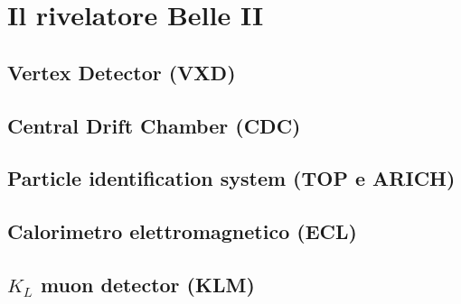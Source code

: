\newpage





\section{Il rivelatore Belle II}

\begin{comment}
Il rivelatore Belle II è uno spettrometro di particelle general-purpose, ottimizzato nelle misure di precisione dei mesoni B e dei loro prodotti di decadimento. Rispetto al suo predecessore Belle, deve riuscire a mantenere buone performance, pur avendo un minore boost nel centro di masse e nonostante sia sottoposto a maggiori livelli di background e quindi di radiazione, che sono la principale causa di una prematura degradazione delle prestazioni e della vita media del rivelatore stesso.

Belle II consiste in una serie di sottorivelatori annidiati, che circondano il PI dei due fasci, posti intorno alla beam pipe di berillio di 1cm di raggio.

\end{comment}

\subsection{Vertex Detector (VXD)}

\subsection{Central Drift Chamber (CDC)}

\subsection{Particle identification system (TOP e ARICH)}

\subsection{Calorimetro elettromagnetico (ECL)}

\subsection{$K_{L}$ muon detector (KLM)}

